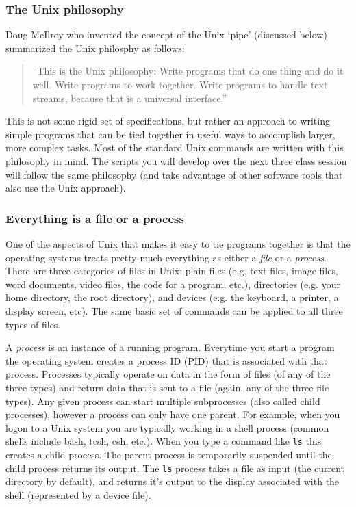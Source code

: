 \subsubsection*{The Unix philosophy}

Doug McIlroy who invented the concept of the Unix `pipe' (discussed below) summarized the Unix philosphy as follows:

\begin{quote}
``This is the Unix philosophy: Write programs that do one thing and do it well. Write programs to work together. Write programs to handle text streams, because that is a universal interface.''
\end{quote}

This is not some rigid set of specifications, but rather an approach to writing simple programs that can be tied together in useful ways to accomplish larger, more complex tasks. Most of the standard Unix commands are written with this philosophy in mind. The scripts you will develop over the next three class session will follow the same philosophy (and take advantage of other software tools that also use the Unix approach).


\subsubsection*{Everything is a file or a process}

One of the aspects of Unix that makes it easy to tie programs together is that the operating systems treats pretty much everything as either a \emph{file} or a \emph{process}.  There are three categories of files in Unix: plain files (e.g. text files, image files, word documents, video files, the code for a program, etc.), directories (e.g. your home directory, the root directory), and devices (e.g. the keyboard, a printer, a display screen, etc). The same basic set of commands can be applied to all three types of files.

A \emph{process} is an instance of a running program.  Everytime you start a program the operating system creates a process ID (PID) that is associated with that process. Processes typically operate on data in the form of files (of any of the three types) and return data that is sent to a file (again, any of the three file types). Any given process can start multiple subprocesses (also called child processes), however a process can only have one parent. For example, when you logon to a Unix system you are typically working in a shell process (common shells include bash, tcsh, csh, etc.). When you type a command like \verb=ls= this creates a child process. The parent process is temporarily suspended until the child process returns its output. The \verb=ls= process takes a file as input (the current directory by default), and returns it's output to the display associated with the shell (represented by a device file).


